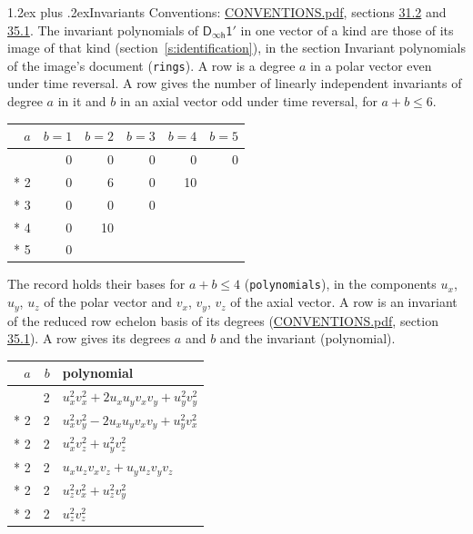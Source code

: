 \documentclass[10pt,a4paper]{article}
\makeatletter
\renewcommand\section{\@startsection{section}{1}{\z@}{-3ex plus -1ex minus -.2ex}%
  {1.2ex plus .2ex}{\normalfont\large\sffamily\bfseries\color{parttitle}}}
\numberwithin{equation}{section}
\newcommand{\grp}[1]{\mathsf{#1}}
\makeatother
\begin{document}
\section{Invariants}\label{s:invariants}
Conventions: \href{../../CONVENTIONS.pdf}{CONVENTIONS.pdf}, sections \href{../../CONVENTIONS.pdf\#conv.31.2}{31.2} and \href{../../CONVENTIONS.pdf\#conv.35.1}{35.1}.
The invariant polynomials of $\grp{D_{\infty h}1'}$ in one vector of a kind are those of its image of that kind (section~\ref{s:identification}), in the section Invariant polynomials of the image's document (\texttt{rings}).
\leavevmode\label{n:index.degree.polar}\label{n:index.degree.axial}A row is a degree $a$ in a polar vector even under time reversal. A row gives the number of linearly independent invariants of degree $a$ in it and $b$ in an axial vector odd under time reversal, for $a + b \le 6$.
{\small\begin{longtable}{@{}rrrrrr@{}}\toprule
$a$ & $b = 1$ & $b = 2$ & $b = 3$ & $b = 4$ & $b = 5$\\\midrule\endhead
\bottomrule\endfoot\endlastfoot
1 & 0 & 0 & 0 & 0 & 0\\*
2 & 0 & 6 & 0 & 10 & \\*
3 & 0 & 0 & 0 &  & \\*
4 & 0 & 10 &  &  & \\*
5 & 0 &  &  &  & \\
\bottomrule\end{longtable}}
\leavevmode\label{n:local.component.polar}\label{n:local.component.axial}The record holds their bases for $a + b \le 4$ (\texttt{polynomials}), in the components $u_{x}$, $u_{y}$, $u_{z}$ of the polar vector and $v_{x}$, $v_{y}$, $v_{z}$ of the axial vector. \label{n:head.polynomial}A row is an invariant of the reduced row echelon basis of its degrees (\href{../../CONVENTIONS.pdf}{CONVENTIONS.pdf}, section \href{../../CONVENTIONS.pdf\#conv.35.1}{35.1}). A row gives its degrees $a$ and $b$ and the invariant (polynomial).
{\small\renewcommand{\arraystretch}{1.2}\begin{longtable}{@{}rrl@{}}\toprule
$a$ & $b$ & polynomial\\\midrule\endhead
\bottomrule\endfoot\endlastfoot
2 & 2 & $u_{x}^{2}v_{x}^{2} + 2u_{x}u_{y}v_{x}v_{y} + u_{y}^{2}v_{y}^{2}$\\*
2 & 2 & $u_{x}^{2}v_{y}^{2} - 2u_{x}u_{y}v_{x}v_{y} + u_{y}^{2}v_{x}^{2}$\\*
2 & 2 & $u_{x}^{2}v_{z}^{2} + u_{y}^{2}v_{z}^{2}$\\*
2 & 2 & $u_{x}u_{z}v_{x}v_{z} + u_{y}u_{z}v_{y}v_{z}$\\*
2 & 2 & $u_{z}^{2}v_{x}^{2} + u_{z}^{2}v_{y}^{2}$\\*
2 & 2 & $u_{z}^{2}v_{z}^{2}$\\
\bottomrule\end{longtable}}
\end{document}
